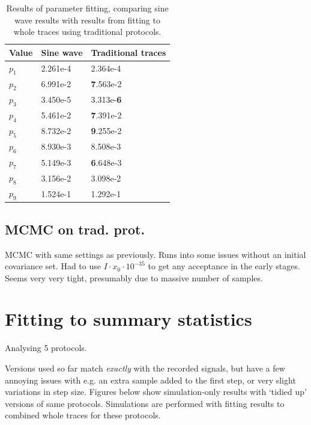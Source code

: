 \documentclass[preprint,authoryear,10pt]{elsarticle}
\newcommand{\startrowcolors}{\rowcolors{2}{gray!15}{white}}
\newcommand*{\thead}[1]{\bfseries #1}
\begin{document}
\begin{table}[H]
\centering
\caption{%
Results of parameter fitting, comparing sine wave results with results from
fitting to whole traces using traditional protocols.
}
\label{tab:sine-wave-loglikelihood2}
\startrowcolors
\footnotesize
\begin{tabular}{lll}
\hline
\thead{Value} & \thead{Sine wave} & \thead{Traditional traces} \\
\hline
$p_1$ & 2.261e-4 & 2.364e-4 \\
$p_2$ & 6.991e-2 & \textbf{7}.563e-2 \\
$p_3$ & 3.450e-5 & 3.313e-\textbf{6} \\
$p_4$ & 5.461e-2 & \textbf{7}.391e-2 \\
$p_5$ & 8.732e-2 & \textbf{9}.255e-2 \\
$p_6$ & 8.930e-3 & 8.508e-3 \\
$p_7$ & 5.149e-3 & \textbf{6}.648e-3 \\
$p_8$ & 3.156e-2 & 3.098e-2 \\
$p_9$ & 1.524e-1 & 1.292e-1 \\
\hline
\end{tabular}
\end{table}





\subsection{MCMC on trad. prot.}

MCMC with same settings as previously.
Runs into some issues without an initial covariance set.
Had to use $I \cdot x_0 \cdot 10^{-35}$ to get any acceptance in the early
 stages.
Seems very very tight, presumably due to massive number of samples.













%
%
%
%
\section{Fitting to summary statistics}

Analysing 5 protocols.

Versions used so far match \emph{exactly} with the recorded signals, but have a
 few annoying issues with e.g. an extra sample added to the first step, or very
 slight variations in step size.
Figures below show simulation-only results with `tidied up' versions of same
 protocols.
Simulations are performed with fitting results to combined whole traces for
 these protocols.
\end{document}
